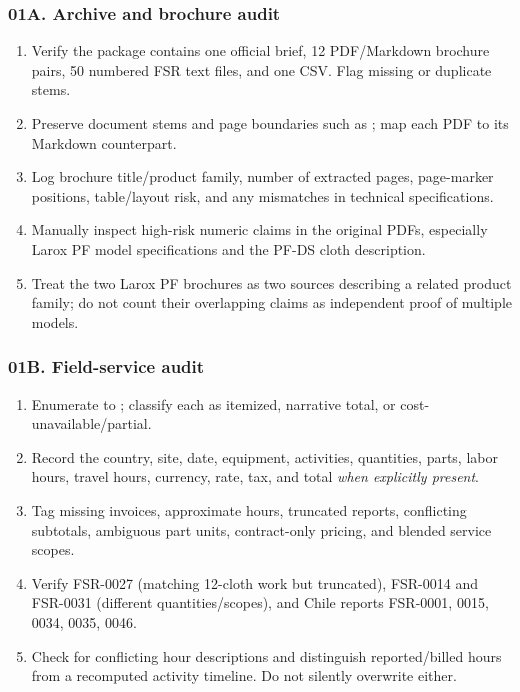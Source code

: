 \documentclass[11pt,a4paper]{article}
\DeclareRobustCommand{\code}[1]{{\ttfamily\small\detokenize{#1}}}
\begin{document}
\subsubsection{01A. Archive and brochure audit}
\begin{enumerate}
\item Verify the package contains one official brief, 12 PDF/Markdown brochure pairs, 50 numbered FSR text files, and one CSV. Flag missing or duplicate stems.
\item Preserve document stems and page boundaries such as \code{## Page 2}; map each PDF to its Markdown counterpart.
\item Log brochure title/product family, number of extracted pages, page-marker positions, table/layout risk, and any mismatches in technical specifications.
\item Manually inspect high-risk numeric claims in the original PDFs, especially Larox PF model specifications and the PF-DS cloth description.
\item Treat the two Larox PF brochures as two sources describing a related product family; do not count their overlapping claims as independent proof of multiple models.
\end{enumerate}
\subsubsection{01B. Field-service audit}
\begin{enumerate}
\item Enumerate \code{FSR-0001.txt} to \code{FSR-0050.txt}; classify each as itemized, narrative total, or cost-unavailable/partial.
\item Record the country, site, date, equipment, activities, quantities, parts, labor hours, travel hours, currency, rate, tax, and total \emph{when explicitly present}.
\item Tag missing invoices, approximate hours, truncated reports, conflicting subtotals, ambiguous part units, contract-only pricing, and blended service scopes.
\item Verify FSR-0027 (matching 12-cloth work but truncated), FSR-0014 and FSR-0031 (different quantities/scopes), and Chile reports FSR-0001, 0015, 0034, 0035, 0046.
\item Check for conflicting hour descriptions and distinguish reported/billed hours from a recomputed activity timeline. Do not silently overwrite either.
\end{enumerate}
\end{document}

